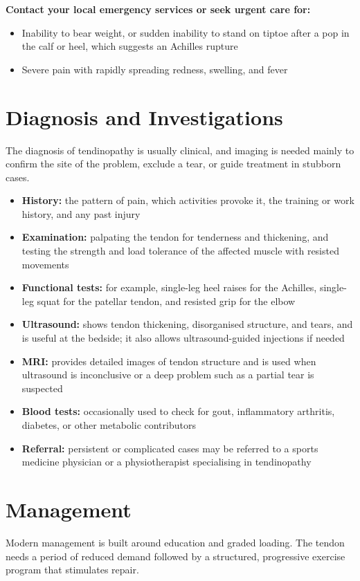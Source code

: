 \textbf{Contact your local emergency services or seek urgent care for:}
\begin{itemize}
    \item Inability to bear weight, or sudden inability to stand on tiptoe after a pop in the calf or heel, which suggests an Achilles rupture
    \item Severe pain with rapidly spreading redness, swelling, and fever
\end{itemize}

\section*{Diagnosis and Investigations}
The diagnosis of tendinopathy is usually clinical, and imaging is needed mainly to confirm the site of the problem, exclude a tear, or guide treatment in stubborn cases.

\begin{itemize}
    \item \textbf{History:} the pattern of pain, which activities provoke it, the training or work history, and any past injury
    \item \textbf{Examination:} palpating the tendon for tenderness and thickening, and testing the strength and load tolerance of the affected muscle with resisted movements
    \item \textbf{Functional tests:} for example, single-leg heel raises for the Achilles, single-leg squat for the patellar tendon, and resisted grip for the elbow
    \item \textbf{Ultrasound:} shows tendon thickening, disorganised structure, and tears, and is useful at the bedside; it also allows ultrasound-guided injections if needed
    \item \textbf{MRI:} provides detailed images of tendon structure and is used when ultrasound is inconclusive or a deep problem such as a partial tear is suspected
    \item \textbf{Blood tests:} occasionally used to check for gout, inflammatory arthritis, diabetes, or other metabolic contributors
    \item \textbf{Referral:} persistent or complicated cases may be referred to a sports medicine physician or a physiotherapist specialising in tendinopathy
\end{itemize}

\section*{Management}
Modern management is built around education and graded loading. The tendon needs a period of reduced demand followed by a structured, progressive exercise program that stimulates repair.

